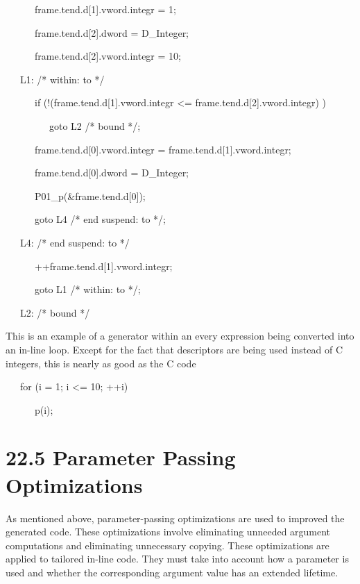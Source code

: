 {\ttfamily\mdseries
\ \ \ \ \ \ frame.tend.d[1].vword.integr = 1;}

{\ttfamily\mdseries
\ \ \ \ \ \ frame.tend.d[2].dword = D\_Integer;}

{\ttfamily\mdseries
\ \ \ \ \ \ frame.tend.d[2].vword.integr = 10;}


\bigskip

{\ttfamily\mdseries
\ \ \ L1: /* within: to */}

{\ttfamily\mdseries
\ \ \ \ \ \ if (!(frame.tend.d[1].vword.integr {\textless}= frame.tend.d[2].vword.integr) )}

{\ttfamily\mdseries
\ \ \ \ \ \ \ \ \ goto L2 /* bound */;}

{\ttfamily\mdseries
\ \ \ \ \ \ frame.tend.d[0].vword.integr = frame.tend.d[1].vword.integr;}

{\ttfamily\mdseries
\ \ \ \ \ \ frame.tend.d[0].dword = D\_Integer;}

{\ttfamily\mdseries
\ \ \ \ \ \ P01\_p(\&frame.tend.d[0]);}

{\ttfamily\mdseries
\ \ \ \ \ \ goto L4 /* end suspend: to */;}

{\ttfamily\mdseries
\ \ \ L4: /* end suspend: to */}

{\ttfamily\mdseries
\ \ \ \ \ \ ++frame.tend.d[1].vword.integr;}

{\ttfamily\mdseries
\ \ \ \ \ \ goto L1 /* within: to */;}

{\ttfamily\mdseries
\ \ \ L2: /* bound */}


This is an example of a generator within an every expression being
converted into an in-line loop. Except for the fact that descriptors
are being used instead of C integers, this is nearly as good as the C
code

{\ttfamily\mdseries
\ \ \ for (i = 1; i {\textless}= 10; ++i)}

{\ttfamily\mdseries
\ \ \ \ \ \ p(i);}


\section[22.5 Parameter Passing Optimizations]{22.5 Parameter Passing Optimizations}

As mentioned above, parameter-passing optimizations are used to
improved the generated code. These optimizations involve eliminating
unneeded argument computations and eliminating unnecessary
copying. These optimizations are applied to tailored in-line
code. They must take into account how a parameter is used and whether
the corresponding argument value has an extended lifetime.

